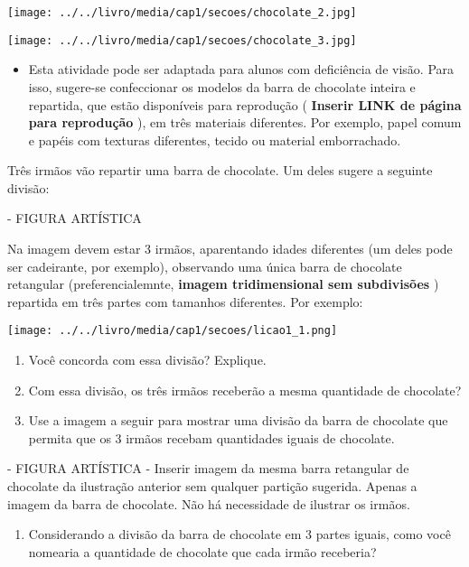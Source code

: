 \documentclass[a4paper,12pt,twoside]{book}
\begin{document}
\begin{professor*}[breakable]{}{}
\begin{imagem*}[breakable]{}{}
        \texttt{[image: ../../livro/media/cap1/secoes/chocolate\_2.jpg]}          
    
        \texttt{[image: ../../livro/media/cap1/secoes/chocolate\_3.jpg]}    
  \end{imagem*}  
  
\begin{itemize} %
    \item       Esta atividade pode ser adaptada para alunos com deficiência de visão. Para isso, sugere-se confeccionar os modelos da barra de chocolate  inteira e repartida, que estão disponíveis para reprodução (      {\bf Inserir LINK de página para reprodução}      ), em três materiais diferentes. Por exemplo, papel comum e papéis com texturas diferentes, tecido ou material emborrachado.  
\end{itemize} %
  
  
\end{professor*}


Três irmãos vão repartir uma barra de chocolate. Um deles sugere a seguinte divisão: 

\begin{imagem*}[breakable]{}{}   - FIGURA ARTÍSTICA   
  
  Na imagem devem estar 3 irmãos, aparentando idades diferentes (um deles pode ser cadeirante, por exemplo), observando uma única barra de chocolate retangular (preferencialemnte,   {\bf imagem tridimensional sem subdivisões}  ) repartida em três partes com tamanhos diferentes. Por exemplo:  
  
    \texttt{[image: ../../livro/media/cap1/secoes/licao1\_1.png]}  
  
\end{imagem*}

\begin{enumerate} [\quad a)] %
  \item     Você concorda com essa divisão? Explique.
  \item     Com essa divisão, os três irmãos receberão a mesma quantidade de chocolate?
  \item     Use a imagem a seguir para mostrar uma divisão da barra de chocolate que permita que os 3 irmãos recebam quantidades iguais de chocolate. 
\end{enumerate} %
\begin{imagem*}[breakable]{}{}    - FIGURA ARTÍSTICA - Inserir imagem da mesma barra retangular de chocolate da ilustração anterior sem qualquer partição sugerida. Apenas a imagem da barra de chocolate. Não há necessidade de ilustrar os irmãos.\end{imagem*}
\begin{enumerate} [\quad a)] %
  \item     Considerando a divisão da barra de chocolate em 3 partes iguais, como você nomearia a quantidade de chocolate que cada irmão receberia? 
\end{enumerate} %
\end{document}
